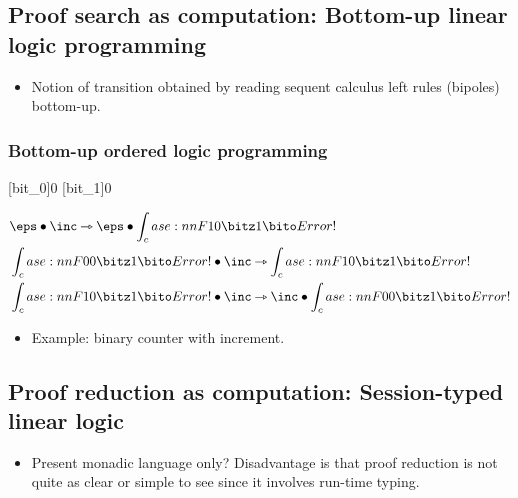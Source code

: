\subsection{Proof search as computation: Bottom-up linear logic programming}\label{sec:linear-lp}

\begin{itemize}
\item Notion of transition obtained by reading sequent calculus left rules  (bipoles) bottom-up.
\end{itemize}

\subsubsection{Bottom-up ordered logic programming}\label{sec:ordered-lp}

\NewPredicate{\bitz}[bit_0]{0}
\NewPredicate{\bito}[bit_1]{0}
\ExplSyntaxOn
{}
\ExplSyntaxOff
{}

\begin{align*}
  &\eps \fuse \inc \lrimp \eps \fuse \bit{1} \\
  &\bit{0} \fuse \inc \lrimp \bit{1} \\
  &\bit{1} \fuse \inc \lrimp \inc \fuse \bit{0}
\end{align*}

\begin{itemize}
\item Example: binary counter with increment.
\end{itemize}

\subsection{Proof reduction as computation: Session-typed linear logic}\label{sec:async-sill}

\begin{itemize}
\item Present monadic language only?  Disadvantage is that proof reduction is not quite as clear or simple to see since it involves run-time typing.
\end{itemize}


